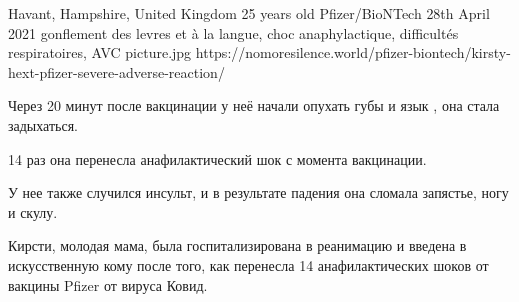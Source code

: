           {Havant, Hampshire, United Kingdom}
          {25 years old}
          {Pfizer/BioNTech}
          {28th April 2021}
          {
            gonflement des levres et à la langue,
            choc anaphylactique,
            difficultés respiratoires,
            AVC
          }
          {picture.jpg}
          {https://nomoresilence.world/pfizer-biontech/kirsty-hext-pfizer-severe-adverse-reaction/}
          {

Через 20 минут после вакцинации у неё начали опухать губы и язык , она стала
задыхаться.

14 раз она перенесла анафилактический шок с момента вакцинации.

У нее также случился инсульт, и в результате падения она сломала запястье, ногу
и скулу.

Кирсти, молодая мама, была госпитализирована в реанимацию и введена в
искусственную кому после того, как перенесла 14 анафилактических шоков от
вакцины Pfizer от вируса Ковид.

          }
